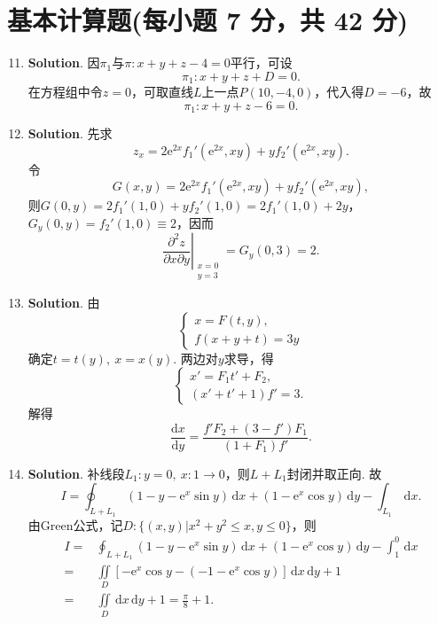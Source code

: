 \documentclass[../main.tex]{subfiles}
\begin{document}
\section{基本计算题(每小题 7 分，共 42 分)}
\begin{enumerate}
    \setcounter{enumi}{10}
    \item \textbf{Solution}. 因$\pi_1$与$\pi:x+y+z-4=0$平行，可设
          \[
              \pi_1:x+y+z+D=0.
          \]
          在方程组中令$z=0$，可取直线$L$上一点$P(10,-4,0)$，代入得$D=-6$，故
          \[
              \pi_1:x+y+z-6=0.
          \]

    \item \textbf{Solution}. 先求
          \[
              z_x=2\mathrm{e}^{2x}f_1'(\mathrm{e}^{2x},xy)+yf_2'(\mathrm{e}^{2x},xy).
          \]
          令
          \[
              G(x,y)=2\mathrm{e}^{2x}f_1'(\mathrm{e}^{2x},xy)+yf_2'(\mathrm{e}^{2x},xy),
          \]
          则$G(0,y)=2f_1'(1,0)+yf_2'(1,0)=2f_1'(1,0)+2y$，$G_y(0,y)=f_2'(1,0)\equiv2$，因而
          \[
              \left.\frac{\partial^{2}z}{\partial x\partial y}\right|_{\substack{x=0\\y=3}}=G_y(0,3)=2.
          \]

    \item \textbf{Solution}. 由
          \[
              \begin{cases}
                  x=F(t,y), \\
                  f(x+y+t)=3y
              \end{cases}
          \]
          确定$t=t(y),\ x=x(y)$. 两边对$y$求导，得
          \[
              \begin{cases}
                  x'=F_1t'+F_2, \\
                  (x'+t'+1)f'=3.
              \end{cases}
          \]
          解得
          \[
              \frac{\mathrm{d}x}{\mathrm{d}y}=\frac{f'F_2+(3-f')F_1}{(1+F_1)f'}.
          \]

    \item \textbf{Solution}. 补线段$L_1:y=0,\ x:1\to0$，则$L+L_1$封闭并取正向. 故
          \[
              I=\oint_{L+L_1}(1-y-\mathrm{e}^x\sin y)\,\mathrm{d}x+(1-\mathrm{e}^x\cos y)\,\mathrm{d}y-
              \int_{L_1}\,\mathrm{d}x.
          \]
          由Green公式，记$D:\{(x,y)|x^2+y^2\le x, y\leq 0\}$，则
          \[
              \begin{aligned}
                  I={} & \oint_{L+L_1}(1-y-\mathrm{e}^x\sin y)\,\mathrm{d}x+(1-\mathrm{e}^x\cos y)\,\mathrm{d}y-\int_{1}^{0}\,\mathrm{d}x \\
                  ={}  & \iint\limits_{D}\left[-\mathrm{e}^x\cos y-\left(-1-\mathrm{e}^x\cos y\right)\right]\,\mathrm{d}x\,\mathrm{d}y+1  \\
                  ={}  & \iint\limits_{D}\,\mathrm{d}x\,\mathrm{d}y+1=\frac{\pi}{8}+1.
              \end{aligned}
          \]


\end{enumerate}
\end{document}
